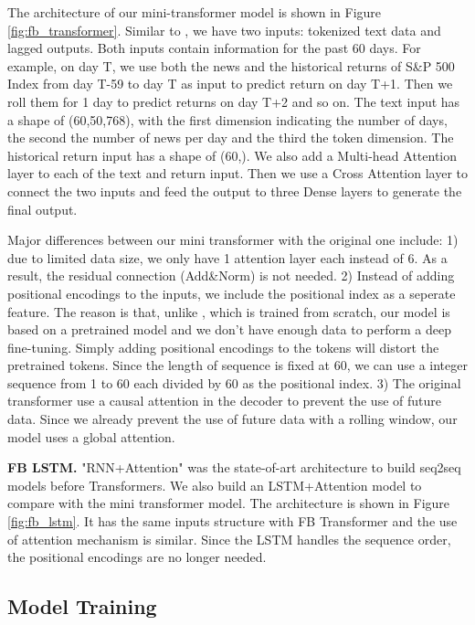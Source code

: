 \documentclass[11pt]{article}
\begin{document}
The architecture of our mini-transformer model is shown in Figure \ref{fig:fb_transformer}. Similar to \citet{NIPS2017_3f5ee243}, we have two inputs: tokenized text data and lagged outputs. Both inputs contain information for the past 60 days. For example, on day T, we use both the news and the historical returns of S\&P 500 Index from day T-59 to day T as input to predict return on day T+1. Then we roll them for 1 day to predict returns on day T+2 and so on. The text input has a shape of (60,50,768), with the first dimension indicating the number of days, the second the number of news per day and the third the token dimension. The historical return input has a shape of (60,). We also add a Multi-head Attention layer to each of the text and return input. Then we use a Cross Attention layer to connect the two inputs and feed the output to three Dense layers to generate the final output.

Major differences between our mini transformer with the original one include: 1) due to limited data size, we only have 1 attention layer each instead of 6. As a result, the residual connection (Add\&Norm) is not needed. 2) Instead of adding positional encodings to the inputs, we include the positional index as a seperate feature. The reason is that, unlike \citet{NIPS2017_3f5ee243}, which is trained from scratch, our model is based on a pretrained model and we don't have enough data to perform a deep fine-tuning. Simply adding positional encodings to the tokens will distort the pretrained tokens. Since the length of sequence is fixed at 60, we can use a integer sequence from 1 to 60 each divided by 60 as the positional index. 3) The original transformer use a causal attention in the decoder to prevent the use of future data. Since we already prevent the use of future data with a rolling window, our model uses a global attention.

\textbf{FB LSTM.} "RNN+Attention" was the state-of-art architecture to build seq2seq models before Transformers. We also build an LSTM+Attention model to compare with the mini transformer model. The architecture is shown in Figure \ref{fig:fb_lstm}. It has the same inputs structure with FB Transformer and the use of attention mechanism is similar. Since the LSTM handles the sequence order, the positional encodings are no longer needed.

\subsection{Model Training}
\end{document}

